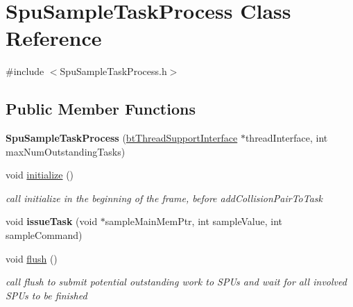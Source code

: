 \hypertarget{class_spu_sample_task_process}{\section{Spu\+Sample\+Task\+Process Class Reference}
\label{class_spu_sample_task_process}
}


{\ttfamily \#include $<$Spu\+Sample\+Task\+Process.\+h$>$}

\subsection*{Public Member Functions}
\begin{DoxyCompactItemize}
\item 
\hypertarget{class_spu_sample_task_process_a8144853118a2787f3ebd8986ef07249f}{{\bfseries Spu\+Sample\+Task\+Process} (\hyperlink{classbt_thread_support_interface}{bt\+Thread\+Support\+Interface} $\ast$thread\+Interface, int max\+Num\+Outstanding\+Tasks)}\label{class_spu_sample_task_process_a8144853118a2787f3ebd8986ef07249f}

\item 
\hypertarget{class_spu_sample_task_process_a955dfb43d04179a0caef12dd9d339ebb}{void \hyperlink{class_spu_sample_task_process_a955dfb43d04179a0caef12dd9d339ebb}{initialize} ()}\label{class_spu_sample_task_process_a955dfb43d04179a0caef12dd9d339ebb}

\begin{DoxyCompactList}\small\item\em call initialize in the beginning of the frame, before add\+Collision\+Pair\+To\+Task \end{DoxyCompactList}\item 
\hypertarget{class_spu_sample_task_process_a2f9d210a42b8bd17d5a118c36fa57a38}{void {\bfseries issue\+Task} (void $\ast$sample\+Main\+Mem\+Ptr, int sample\+Value, int sample\+Command)}\label{class_spu_sample_task_process_a2f9d210a42b8bd17d5a118c36fa57a38}

\item 
\hypertarget{class_spu_sample_task_process_ad9804e89ae7a0a54c0d43bebd13f3cb9}{void \hyperlink{class_spu_sample_task_process_ad9804e89ae7a0a54c0d43bebd13f3cb9}{flush} ()}\label{class_spu_sample_task_process_ad9804e89ae7a0a54c0d43bebd13f3cb9}

\begin{DoxyCompactList}\small\item\em call flush to submit potential outstanding work to S\+P\+Us and wait for all involved S\+P\+Us to be finished \end{DoxyCompactList}\end{DoxyCompactItemize}


